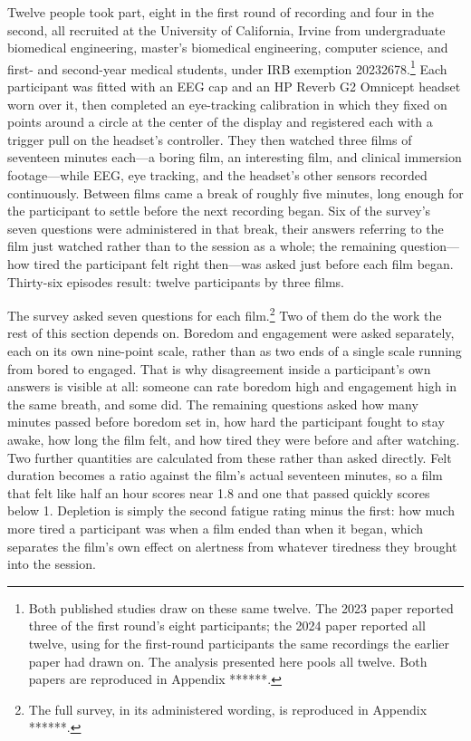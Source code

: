 Twelve people took part, eight in the first round of recording and four in the second, all
recruited at the University of California, Irvine from undergraduate biomedical engineering,
master's biomedical engineering, computer science, and first- and second-year medical
students, under IRB exemption 20232678.\footnote{Both published studies draw on these same
twelve. The 2023 paper reported three of the first round's eight participants; the 2024 paper
reported all twelve, using for the first-round participants the same recordings the earlier
paper had drawn on. The analysis presented here pools all twelve. Both papers are reproduced
in Appendix ******.} Each participant was fitted with an EEG cap and an HP Reverb G2 Omnicept
headset worn over it, then completed an eye-tracking calibration in which they fixed on points
around a circle at the center of the display and registered each with a trigger pull on the
headset's controller. They then
watched three films of seventeen minutes each---a boring film, an interesting film, and
clinical immersion footage---while EEG, eye tracking, and the headset's other sensors recorded
continuously. Between films came a break of roughly five minutes, long enough for the
participant to settle before the next recording began. Six of the survey's seven questions
were administered in that break, their answers referring to the film just watched rather than
to the session as a whole; the remaining question---how tired the participant felt right
then---was asked just before each film began. Thirty-six episodes result: twelve participants
by three films.

The survey asked seven questions for each film.\footnote{The full survey, in its administered
wording, is reproduced in Appendix ******.} Two of them do the work the rest of this section depends on. Boredom and
engagement were asked separately, each on its own nine-point scale, rather than as two ends of a
single scale running from bored to engaged. That is why disagreement inside a participant's own
answers is visible at all: someone can rate boredom high and engagement high in the same breath,
and some did. The remaining questions asked how many minutes passed before boredom set in, how
hard the participant fought to stay awake, how long the film felt, and how tired they were
before and after watching. Two further quantities are calculated from these rather than asked
directly. Felt duration becomes a ratio against the film's actual seventeen minutes, so a film
that felt like half an hour scores near 1.8 and one that passed quickly scores below 1.
Depletion is simply the second fatigue rating minus the first: how much more tired a participant
was when a film ended than when it began, which separates the film's own effect on alertness
from whatever tiredness they brought into the session.

